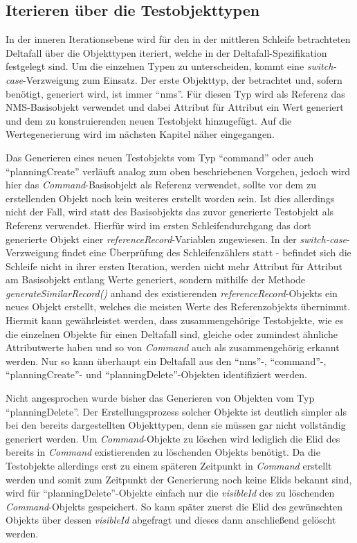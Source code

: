 \subsection{Iterieren über die Testobjekttypen}\label{subsec:iterationObjectTypes}
In der inneren Iterationsebene wird für den in der mittleren Schleife betrachteten Deltafall über die Objekttypen iteriert, welche in der Deltafall-Spezifikation festgelegt sind. Um die einzelnen Typen zu unterscheiden, kommt eine \textit{switch-case}-Verzweigung zum Einsatz. Der erste Objekttyp, der betrachtet und, sofern benötigt, generiert wird, ist immer \enquote{nms}. Für diesen Typ wird als Referenz das \ac{NMS}-Basisobjekt verwendet und dabei Attribut für Attribut ein Wert generiert und dem zu konstruierenden neuen Testobjekt hinzugefügt. Auf die Wertegenerierung wird im nächsten Kapitel näher eingegangen.

Das Generieren eines neuen Testobjekts vom Typ \enquote{command} oder auch \enquote{planningCreate} verläuft analog zum oben beschriebenen Vorgehen, jedoch wird hier das \textit{Command}-Basisobjekt als Referenz verwendet, sollte vor dem zu erstellenden Objekt noch kein weiteres erstellt worden sein. Ist dies allerdings nicht der Fall, wird statt des Basisobjekts das zuvor generierte Testobjekt als Referenz verwendet. Hierfür wird im ersten Schleifendurchgang das dort generierte Objekt einer \textit{referenceRecord}-Variablen zugewiesen. In der \textit{switch-case}-Verzweigung findet eine Überprüfung des Schleifenzählers statt - befindet sich die Schleife nicht in ihrer ersten Iteration, werden nicht mehr Attribut für Attribut am Basisobjekt entlang Werte generiert, sondern mithilfe der Methode \textit{generateSimilarRecord()} anhand des existierenden \textit{referenceRecord}-Objekts ein neues Objekt erstellt, welches die meisten Werte des Referenzobjekts übernimmt. Hiermit kann gewährleistet werden, dass zusammengehörige Testobjekte, wie es die einzelnen Objekte für einen Deltafall sind, gleiche oder zumindest ähnliche Attributwerte haben und so von \textit{Command} auch als zusammengehörig erkannt werden. Nur so kann überhaupt ein Deltafall aus den \enquote{nms}-, \enquote{command}-, \enquote{planningCreate}- und \enquote{planningDelete}-Objekten identifiziert werden.

Nicht angesprochen wurde bisher das Generieren von Objekten vom Typ \enquote{planningDelete}. Der Erstellungsprozess solcher Objekte ist deutlich simpler als bei den bereits dargestellten Objekttypen, denn sie müssen gar nicht vollständig generiert werden. Um \textit{Command}-Objekte zu löschen wird lediglich die \ac{Elid} des bereits in \textit{Command} existierenden zu löschenden Objekts benötigt. Da die Testobjekte allerdings erst zu einem späteren Zeitpunkt in \textit{Command} erstellt werden und somit zum Zeitpunkt der Generierung noch keine \ac{Elid}s bekannt sind, wird für \enquote{planningDelete}-Objekte einfach nur die \textit{visibleId} des zu löschenden \textit{Command}-Objekts gespeichert. So kann später zuerst die \ac{Elid} des gewünschten Objekts über dessen \textit{visibleId} abgefragt und dieses dann anschließend gelöscht werden.

